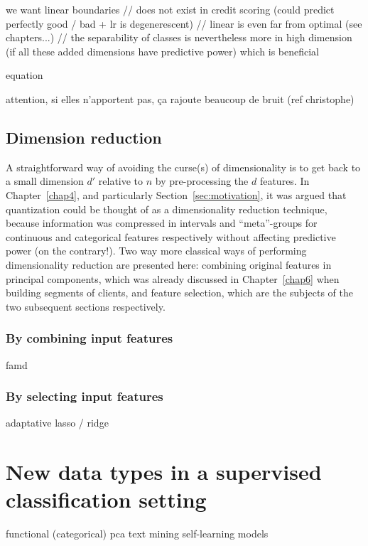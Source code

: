 we want linear boundaries // does not exist in credit scoring (could predict perfectly good / bad + lr is degenerescent) // linear is even far from optimal (see chapters...) // the separability of classes is nevertheless more in high dimension (if all these added dimensions have predictive power) which is beneficial

equation

attention, si elles n'apportent pas, ça rajoute beaucoup de bruit (ref christophe)

\subsection{Dimension reduction}

A straightforward way of avoiding the curse(s) of dimensionality is to get back to a small dimension $d'$ relative to $n$ by pre-processing the $d$ features. In Chapter~\ref{chap4}, and particularly Section~\ref{sec:motivation}, it was argued that quantization could be thought of as a dimensionality reduction technique, because information was compressed in intervals and ``meta''-groups for continuous and categorical features respectively without affecting predictive power (on the contrary!). Two way more classical ways of performing dimensionality reduction are presented here: combining original features in principal components, which was already discussed in Chapter~\ref{chap6} when building segments of clients, and feature selection, which are the subjects of the two subsequent sections respectively.

\subsubsection{By combining input features}

\gls{famd}

\subsubsection{By selecting input features}

adaptative lasso / ridge 

\section{New data types in a supervised classification setting}

functional (categorical) pca
text mining
self-learning models

